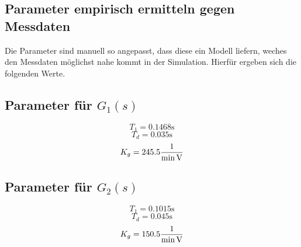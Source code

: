 \subsection{Parameter empirisch ermitteln gegen Messdaten}
Die Parameter sind manuell so angepasst, dass diese ein Modell liefern, weches
den Messdaten möglichst nahe kommt in der Simulation. Hierfür ergeben sich die
folgenden Werte.

\subsection{Parameter für $G_1(s)$}
\[ T_1 = 0.1468\si{\second} \]
\[ T_d = 0.035\si{\second} \]
\[ K_g = 245.5\si[per-mode=fraction]{\per\minute\per\volt} \]

\subsection{Parameter für $G_2(s)$}
\[ T_1 = 0.1015\si{\second} \]
\[ T_d = 0.045\si{\second} \]
\[ K_g = 150.5\si[per-mode=fraction]{\per\minute\per\volt} \]

